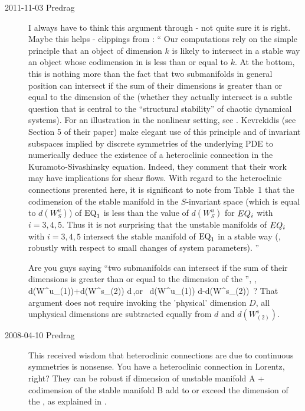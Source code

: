 \begin{description}
\item[2011-11-03 Predrag] I always have to think this argument through -
  not quite sure it is right. Maybe this helps -
  clippings from : ``
  Our computations rely on the simple principle that an object of dimension
  $k$ is likely to intersect in a stable way an object whose codimension in
  {\statesp} is less than or equal to $k$. At the bottom, this is nothing
  more than the fact that two submanifolds in general position can
  intersect if the sum of their dimensions is greater than or equal to the
  dimension of the {\statesp} (whether they actually intersect is a subtle
  question that is central to the ``structural stability'' of chaotic
  dynamical systems). For an illustration in the nonlinear
  setting, see . Kevrekidis \etal{} (see Section 5
  of their paper) make elegant use of this principle and of invariant
  subspaces implied by discrete symmetries of the underlying PDE to
  numerically deduce the existence of a heteroclinic connection in the
  Kuramoto-Sivashinsky equation. Indeed, they comment that their work may
  have implications for shear flows. With regard to the heteroclinic
  connections presented here, it is significant to note from Table~1 that
  the codimension of the stable manifold in the $S$-invariant space (which
  is equal to $d(W^u_S)$) of ${\text{EQ}_1}$ is less than the value of $d(W^u_S)$
  for $EQ_{i}$ with $i=3,4,5$. Thus it is not surprising that the unstable
  manifolds of $EQ_{i}$ with $i=3,4,5$ intersect the stable manifold of
  {${\text{EQ}_1}$} in a stable way (\ie, robustly with respect to small changes of
  system parameters).
  ''

  Are you guys saying ``two submanifolds can intersect if the sum of their
  dimensions is greater than or equal to the dimension of the {\statesp}'',
  \ie,
  \beq
  d(W^u_{(1)})+d(W^s_{(2)}) \geq d\,,\quad \mbox{or }
  d(W^u_{(1)}) \geq d-d(W^s_{(2)})
  \,?
  That argument does not require invoking the 'physical' dimension $D$, all
  unphysical dimensions are subtracted equally from $ d$ and $d(W^s_{(2)})$.

\item[2008-04-10 Predrag]
  This received wisdom that heteroclinic connections are due to
  continuous symmetries is nonsense. You have a heteroclinic connection
  in Lorentz, right? They can be robust if dimension of unstable
  manifold A + codimension of the stable manifold B add to or exceed
  the dimension of the \statesp, as explained in .


\end{description}
